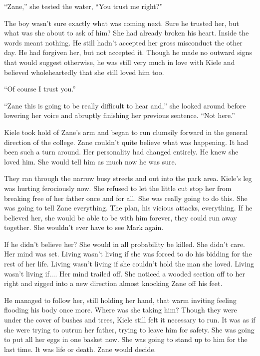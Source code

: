 ``Zane,'' she tested the water, ``You trust me right?''

The boy wasn't sure exactly what was coming next.  Sure he trusted her, but what was she about to ask of him?  She had already broken his heart.  Inside the words meant nothing.  He still hadn't accepted her gross misconduct the other day.  He had forgiven her, but not accepted it.  Though he made no outward signs that would suggest otherwise, he was still very much in love with Kiele and believed wholeheartedly that she still loved him too.

``Of course I trust you.''

``Zane this is going to be really difficult to hear and,'' she looked around before lowering her voice and abruptly finishing her previous sentence.  ``Not here.''

Kiele took hold of Zane's arm and began to run clumsily forward in the general direction of the college.  Zane couldn't quite believe what was happening.  It had been such a turn around.  Her personality had changed entirely.  He knew she loved him.  She would tell him as much now he was sure.  

They ran through the narrow busy streets and out into the park area.  Kiele's leg was hurting ferociously now.  She refused to let the little cut stop her from breaking free of her father once and for all.  She was really going to do this.  She was going to tell Zane everything.  The plan, his vicious attacks, everything.  If he believed her, she would be able to be with him forever, they could run away together.  She wouldn't ever have to see Mark again.  

If he didn't believe her?  She would in all probability be killed.  She didn't care.  Her mind was set.  Living wasn't living if she was forced to do his bidding for the rest of her life. Living wasn't living if she couldn't hold the man she loved.  Living wasn't living if....  Her mind trailed off.  She noticed a wooded section off to her right and zigged into a new direction almost knocking Zane off his feet.

He managed to follow her, still holding her hand, that warm inviting feeling flooding his body once more.  Where was she taking him?  Though they were under the cover of bushes and trees, Kiele still felt it necessary to run.  It was as if she were trying to outrun her father, trying to leave him for safety.  She was going to put all her eggs in one basket now.  She was going to stand up to him for the last time.  It was life or death.  Zane would decide.

